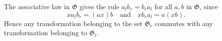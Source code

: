 The associative law in $\mathfrak{G}$ gives the rule $a_l b_r = b_r a_l$ for all $a, b$ in $\mathfrak{G}$, since
$$x a_l b_r = (ax)b \quad \text{and} \quad x b_r a_l = a(xb).$$
Hence any transformation belonging to the set $\mathfrak{G}_r$ commutes with any transformation belonging to $\mathfrak{G}_l$.
